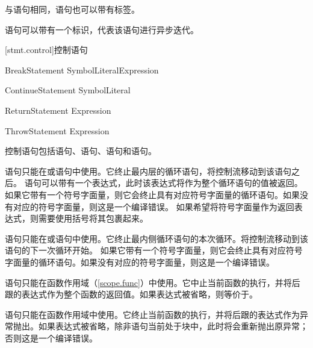 \pnum
与语句相同，语句也可以带有标签。

\pnum
{}语句可以带有一个标识，代表该语句进行异步迭代。

[stmt.control]{控制语句}

\begin{bnf}{BreakStatement}
     SymbolLiteral\bnfq Expression\bnfq \terminal{;}
\end{bnf}

\begin{bnf}{ContinueStatement}
     SymbolLiteral\bnfq \terminal{;}
\end{bnf}

\begin{bnf}{ReturnStatement}
     Expression\bnfq \terminal{;}
\end{bnf}

\begin{bnf}{ThrowStatement}
     Expression\bnfq \terminal{;}
\end{bnf}

\pnum
控制语句包括语句、语句、语句和语句。

\pnum
{}语句只能在或语句中使用。它终止最内层的循环语句，将控制流移动到该语句之后。
语句可以带有一个表达式，此时该表达式将作为整个循环语句的值被返回。
如果它带有一个符号字面量，则它会终止具有对应符号字面量的循环语句。如果没有对应的符号字面量，则这是一个编译错误。
\enternote 如果希望将符号字面量作为返回表达式，则需要使用括号将其包裹起来。 \exitnote

\pnum
{}语句只能在或语句中使用。它终止最内侧循环语句的本次循环。将控制流移动到该语句的下一次循环开始。
如果它带有一个符号字面量，则它会终止具有对应符号字面量的循环语句。如果没有对应的符号字面量，则这是一个编译错误。

\pnum
{}语句只能在函数作用域（\ref{scope.func}）中使用。它中止当前函数的执行，并将后跟的表达式作为整个函数的返回值。如果表达式被省略，则等价于\tcode{()}。

\pnum
{}语句只能在函数作用域中使用。它终止当前函数的执行，并将后跟的表达式作为异常抛出。如果表达式被省略，除非语句当前处于块中，此时将会重新抛出原异常；否则这是一个编译错误。
